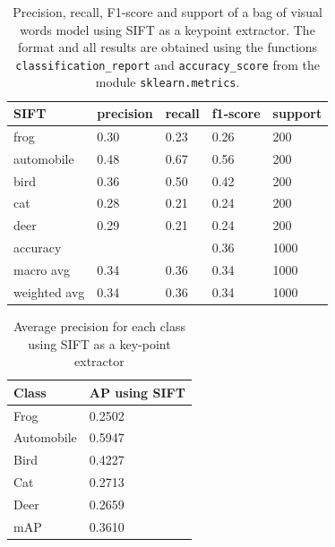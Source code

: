 \documentclass[12pt,a4paper,oneside]{paper}
\begin{document}
\newpage
\begin{table}[t]
    \centering
    \begin{tabular}{||l||l|l|l|l||}
        \hline
        SIFT         & precision & recall & f1-score & support \\
        \hline
        frog         & 0.30      & 0.23   & 0.26     & 200     \\
        automobile   & 0.48      & 0.67   & 0.56     & 200     \\
        bird         & 0.36      & 0.50   & 0.42     & 200     \\
        cat          & 0.28      & 0.21   & 0.24     & 200     \\
        deer         & 0.29      & 0.21   & 0.24     & 200     \\
        \hline \hline
        accuracy     &           &        & 0.36     & 1000    \\
        macro avg    & 0.34      & 0.36   & 0.34     & 1000    \\
        weighted avg & 0.34      & 0.36   & 0.34     & 1000    \\
        \hline
    \end{tabular}
    \caption{Precision, recall, F1-score and support of a bag of visual words model using SIFT as a keypoint extractor. The format and all results are obtained using the functions \texttt{classification\_report} and \texttt{accuracy\_score} from the module \texttt{sklearn.metrics}.}
    \label{tab:SIFT_prf1s}
\end{table}

\begin{table}[h]
    \centering
    \begin{tabular}{||l|l||}
        \hline
        Class      & AP using SIFT \\
        \hline
        Frog       & 0.2502 \\
        Automobile & 0.5947 \\
        Bird       & 0.4227 \\
        Cat        & 0.2713 \\
        Deer       & 0.2659 \\
        \hline \hline
        mAP        & 0.3610 \\
        \hline
    \end{tabular}
    \caption{Average precision for each class using SIFT as a key-point extractor}
    \label{tab:SIFT_map}
\end{table}
\end{document}
